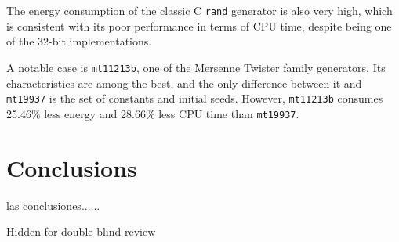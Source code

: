 \documentclass[sigconf]{acmart}
\begin{document}
The energy consumption of the classic C \texttt{rand} generator is also very high, which is consistent with its poor performance in terms of CPU time, despite being one of the 32-bit implementations.

A notable case is \texttt{mt11213b}, one of the Mersenne Twister family generators. Its characteristics are among the best, and the only difference between it and \texttt{mt19937} is the set of constants and initial seeds. However, \texttt{mt11213b} consumes 25.46\% less energy and 28.66\% less CPU time than \texttt{mt19937}.


\section{Conclusions}
\label{sec:conclusions}

las conclusiones......

\begin{acks}
Hidden for double-blind review
\end{acks}



\end{document}
